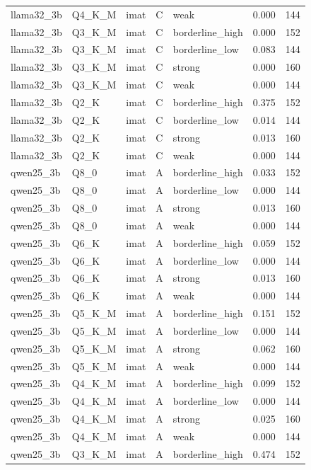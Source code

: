 \begin{tabular}{lllllrr}
llama32\_3b & Q4\_K\_M & imat & C & weak & 0.000 & 144 \\
llama32\_3b & Q3\_K\_M & imat & C & borderline\_high & 0.000 & 152 \\
llama32\_3b & Q3\_K\_M & imat & C & borderline\_low & 0.083 & 144 \\
llama32\_3b & Q3\_K\_M & imat & C & strong & 0.000 & 160 \\
llama32\_3b & Q3\_K\_M & imat & C & weak & 0.000 & 144 \\
llama32\_3b & Q2\_K & imat & C & borderline\_high & 0.375 & 152 \\
llama32\_3b & Q2\_K & imat & C & borderline\_low & 0.014 & 144 \\
llama32\_3b & Q2\_K & imat & C & strong & 0.013 & 160 \\
llama32\_3b & Q2\_K & imat & C & weak & 0.000 & 144 \\
qwen25\_3b & Q8\_0 & imat & A & borderline\_high & 0.033 & 152 \\
qwen25\_3b & Q8\_0 & imat & A & borderline\_low & 0.000 & 144 \\
qwen25\_3b & Q8\_0 & imat & A & strong & 0.013 & 160 \\
qwen25\_3b & Q8\_0 & imat & A & weak & 0.000 & 144 \\
qwen25\_3b & Q6\_K & imat & A & borderline\_high & 0.059 & 152 \\
qwen25\_3b & Q6\_K & imat & A & borderline\_low & 0.000 & 144 \\
qwen25\_3b & Q6\_K & imat & A & strong & 0.013 & 160 \\
qwen25\_3b & Q6\_K & imat & A & weak & 0.000 & 144 \\
qwen25\_3b & Q5\_K\_M & imat & A & borderline\_high & 0.151 & 152 \\
qwen25\_3b & Q5\_K\_M & imat & A & borderline\_low & 0.000 & 144 \\
qwen25\_3b & Q5\_K\_M & imat & A & strong & 0.062 & 160 \\
qwen25\_3b & Q5\_K\_M & imat & A & weak & 0.000 & 144 \\
qwen25\_3b & Q4\_K\_M & imat & A & borderline\_high & 0.099 & 152 \\
qwen25\_3b & Q4\_K\_M & imat & A & borderline\_low & 0.000 & 144 \\
qwen25\_3b & Q4\_K\_M & imat & A & strong & 0.025 & 160 \\
qwen25\_3b & Q4\_K\_M & imat & A & weak & 0.000 & 144 \\
qwen25\_3b & Q3\_K\_M & imat & A & borderline\_high & 0.474 & 152 \\

\end{tabular}
